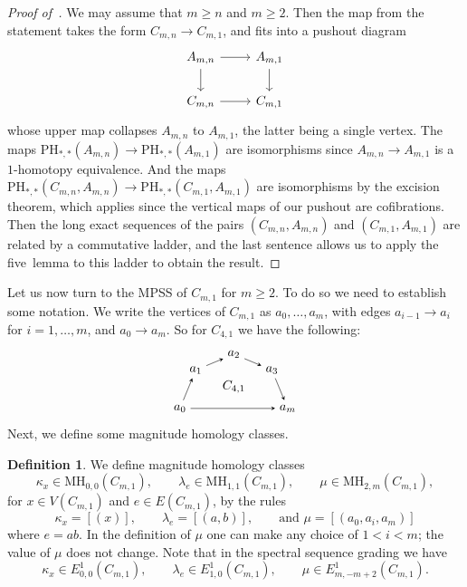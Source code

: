 \documentclass[a4paper, 11 pt, oneside, reqno]{amsart}
\numberwithin{lemma}{section}
\theoremstyle{definition}
\newtheorem{definition}[lemma]{Definition}
\newcommand{\MH}{\mathrm{MH}}
\newcommand{\PH}{\mathrm{PH}}
\begin{document}
\begin{proof}[Proof of~]
    We may assume that $m\geq n$ and $m\geq 2$.
    Then the map from the statement takes the form
    $C_{m,n}\to C_{m,1}$,  
    and fits into a pushout diagram
    \[\begin{tikzcd}
        A_{m,n} \arrow{r} \arrow{d} & A_{m,1} \arrow{d} \\
        C_{m,n} \arrow{r} & C_{m,1}
    \end{tikzcd}\]
    whose upper map collapses $A_{m,n}$ to $A_{m,1}$,
    the latter being a single vertex.
    The maps 
    $\PH_{\ast,\ast}(A_{m,n})\to \PH_{\ast,\ast}(A_{m,1})$
    are isomorphisms since $A_{m,n}\to A_{m,1}$ 
    is a $1$-homotopy equivalence.
    And the maps 
    $\PH_{\ast,\ast}(C_{m,n},A_{m,n})
    \to 
    \PH_{\ast,\ast}(C_{m,1},A_{m,1})$
    are isomorphisms by
    the excision theorem, which applies since the 
    vertical maps of our pushout are cofibrations.
    Then the long exact sequences of the pairs 
    $(C_{m,n},A_{m,n})$ 
    and  
    $(C_{m,1},A_{m,1})$
    are related by a commutative ladder,
    and the last sentence allows us to 
    apply the five~lemma to this ladder to
    obtain the result.
\end{proof}

Let us now turn to the MPSS of $C_{m,1}$ for $m\geq 2$.
To do so we need to establish some notation.
We write the vertices of $C_{m,1}$ as $a_0,\ldots,a_m$, 
with edges $a_{i-1}\to a_i$ for $i=1,\ldots,m$,
and $a_0\to a_m$.
So for $C_{4,1}$ we have the following:
\[
    \begin{tikzpicture}[baseline=0]
        \node(x) at (180:1.5) {$a_0$};
        \node(y) at (0:1.5) {$a_m$};

        \node (a2) at (135:1.5) {$a_1$};
        \node (a3) at (90:1.5) {$a_2$};
        \node (a4) at (45:1.5) {$a_3$};

        \draw[-stealth] (x) -- (a2);
        \draw[-stealth] (a2) -- (a3);
        \draw[-stealth] (a3) -- (a4);
        \draw[-stealth] (a4) -- (y);

        \draw[-stealth] (x) -- (y);
        
        \node () at (0,0.6) {$C_{4,1}$};
    \end{tikzpicture}
\]
Next, we define some magnitude homology classes.

\begin{definition}
    We define magnitude homology classes 
    \[
        \kappa_x\in\MH_{0,0}(C_{m,1}),
        \qquad
        \lambda_e\in\MH_{1,1}(C_{m,1}),
        \qquad
        \mu\in\MH_{2,m}(C_{m,1}),
    \]
    for $x\in V(C_{m,1})$ and $e\in E(C_{m,1})$,
    by the rules
    \[
        \kappa_x = [(x)], 
        \qquad 
        \lambda_e = [(a,b)],
        \qquad
        \text{and\ }
        \mu = [(a_0,a_i,a_m)]
    \]
    where $e=ab$.
    In the definition of $\mu$ one can make any choice of
    $1<i<m$; the value of $\mu$ does not change.
    Note that in the spectral sequence grading we have
    \[
        \kappa_x\in E^1_{0,0}(C_{m,1}),
        \qquad
        \lambda_e\in E^1_{1,0}(C_{m,1}),
        \qquad
        \mu\in E^1_{m,-m+2}(C_{m,1}).
    \] 
\end{definition}
\end{document}
